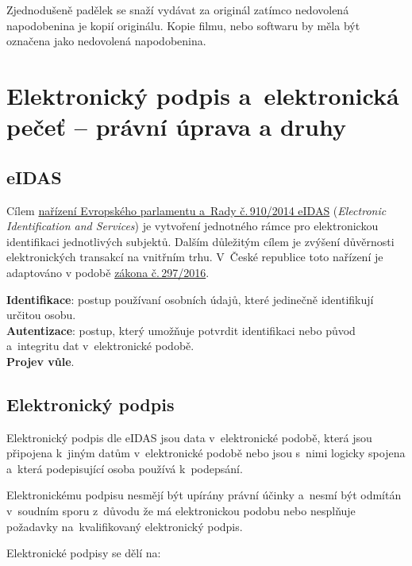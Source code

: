 Zjednodušeně padělek se snaží vydávat za originál zatímco nedovolená napodobenina je kopií originálu. Kopie filmu, nebo softwaru by měla být označena jako nedovolená napodobenina.






\clearpage
\section[Elektronický podpis a~elektronická pečeť -- právní úprava a~druhy]{Elektronický podpis a~elektronická pečeť -- \newline právní úprava a druhy}

\subsection{eIDAS}

Cílem \href{https://eur-lex.europa.eu/legal-content/CS/TXT/?uri=CELEX\%3A32014R0910}{nařízení Evropského parlamentu a~Rady č.\,910/2014 eIDAS} (\emph{Electronic Identification and Services}) je vytvoření jednotného rámce pro elektronickou identifikaci jednotlivých subjektů. Dalším důležitým cílem je zvýšení důvěrnosti elektronických transakcí na vnitřním trhu. V~České republice toto nařízení je adaptováno v podobě \href{https://www.zakonyprolidi.cz/cs/2016-297}{zákona č.\,297/2016}.

\textbf{Identifikace}: postup používaní osobních údajů, které jedinečně identifikují určitou osobu. \\
\textbf{Autentizace}: postup, který umožňuje potvrdit identifikaci nebo původ a~integritu dat v~elektronické podobě. \\
\textbf{Projev vůle}.

\subsection{Elektronický podpis}

Elektronický podpis dle eIDAS jsou data v~elektronické podobě, která jsou připojena k~jiným datům v~elektronické podobě nebo jsou s~nimi logicky spojena a~která podepisující osoba používá k~podepsání.

Elektronickému podpisu nesmějí být upírány právní účinky a~nesmí být odmítán v~soudním sporu z~důvodu že má elektronickou podobu nebo nesplňuje požadavky na~kvalifikovaný elektronický podpis.

Elektronické podpisy se dělí na:

